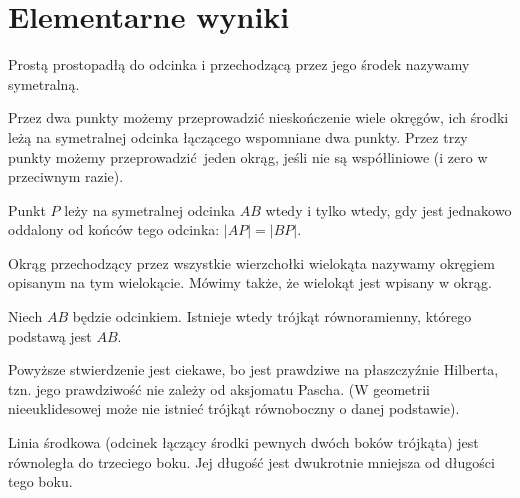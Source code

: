 \section{Elementarne wyniki}

\begin{definition}[symetralna]
	Prostą prostopadłą do odcinka i przechodzącą przez jego środek nazywamy symetralną.
\end{definition}

Przez dwa punkty możemy przeprowadzić nieskończenie wiele okręgów, ich środki leżą na symetralnej odcinka łączącego wspomniane dwa punkty.
Przez trzy punkty możemy przeprowadzić jeden okrąg, jeśli nie są współliniowe (i zero w przeciwnym razie).

\begin{proposition} %
	Punkt $P$ leży na symetralnej odcinka $AB$ wtedy i tylko wtedy, gdy jest jednakowo oddalony od końców tego odcinka: $|AP| = |BP|$.
\end{proposition}


Okrąg przechodzący przez wszystkie wierzchołki wielokąta nazywamy okręgiem opisanym na tym wielokącie.
Mówimy także, że wielokąt jest wpisany w okrąg.
%

\begin{proposition}
	\label{hartshorne_52x}
    Niech $AB$ będzie odcinkiem.
	Istnieje wtedy trójkąt równoramienny, którego podstawą jest $AB$.
\end{proposition}

Powyższe stwierdzenie jest ciekawe, bo jest prawdziwe na płaszczyźnie Hilberta, tzn. jego prawdziwość nie zależy od aksjomatu Pascha.
(W geometrii nieeuklidesowej może nie istnieć trójkąt równoboczny o danej podstawie).

\begin{proposition}
	\label{hartshorne_52}
	Linia środkowa (odcinek łączący środki pewnych dwóch boków trójkąta) jest równoległa do trzeciego boku.
    Jej długość jest dwukrotnie mniejsza od długości tego boku.
\end{proposition}

